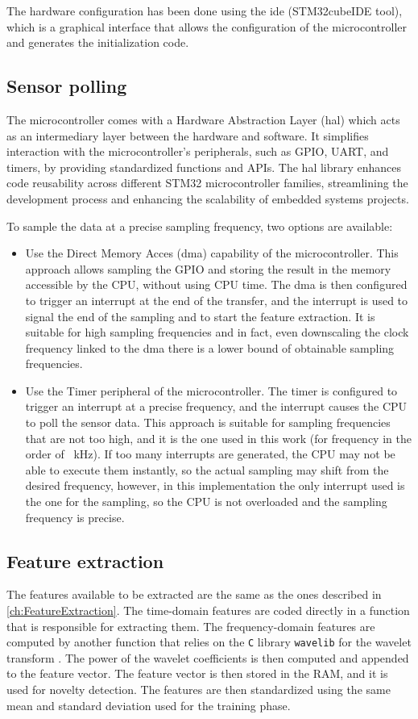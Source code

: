 The hardware configuration has been done using the \gls{ide} ({STM32cubeIDE} tool), which is a graphical interface that allows the configuration of the microcontroller and generates the initialization code. 

\subsection{Sensor polling}
The microcontroller comes with a Hardware Abstraction Layer (\gls{hal}) which acts as an intermediary layer between the hardware and software. It simplifies interaction with the microcontroller's peripherals, such as GPIO, UART, and timers, by providing standardized functions and APIs. The \gls{hal} library enhances code reusability across different STM32 microcontroller families, streamlining the development process and enhancing the scalability of embedded systems projects.

To sample the data at a precise sampling frequency, two options are available:
\begin{itemize}
    \item Use the Direct Memory Acces (\gls{dma}) capability of the microcontroller. This approach allows sampling the GPIO and storing the result in the memory accessible by the CPU, without using CPU time. The \gls{dma} is then configured to trigger an interrupt at the end of the transfer, and the interrupt is used to signal the end of the sampling and to start the feature extraction. It is suitable for high sampling frequencies and in fact, even downscaling the clock frequency linked to the \gls{dma} there is a lower bound of obtainable sampling frequencies.
    \item Use the Timer peripheral of the microcontroller. The timer is configured to trigger an interrupt at a precise frequency, and the interrupt causes the CPU to poll the sensor data. This approach is suitable for sampling frequencies that are not too high, and it is the one used in this work (for frequency in the order of \SI{ }{\kilo\hertz}).
    If too many interrupts are generated, the CPU may not be able to execute them instantly, so the actual sampling may shift from the desired frequency, however, in this implementation the only interrupt used is the one for the sampling, so the CPU is not overloaded and the sampling frequency is precise.
\end{itemize}


\subsection{Feature extraction}
The features available to be extracted are the same as the ones described in \autoref{ch:FeatureExtraction}. The time-domain features are coded directly in a function that is responsible for extracting them. The frequency-domain features are computed by another function that relies on the \texttt{C} library \texttt{wavelib} for the wavelet transform \cite{wavelib}. The power of the wavelet coefficients is then computed and appended to the feature vector. The feature vector is then stored in the RAM, and it is used for novelty detection.
The features are then standardized using the same mean and standard deviation used for the training phase. 

